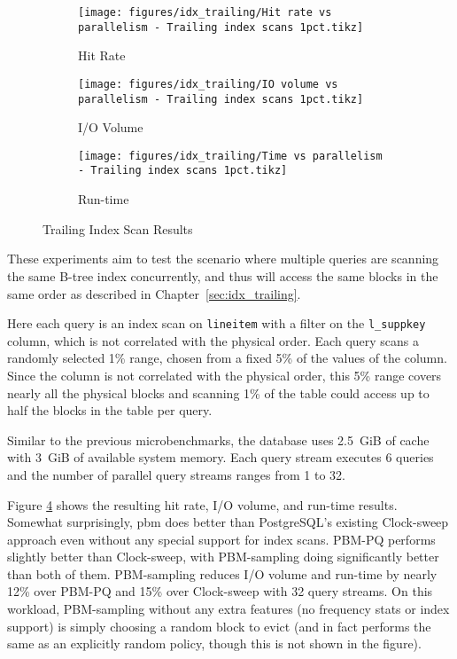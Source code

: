 \begin{figure}
\centering
    \begin{subfigure}{0.45\textwidth}
        \centering
        \texttt{[image: figures/idx\_trailing/Hit rate vs parallelism - Trailing index scans 1pct.tikz]}
        \caption{Hit Rate}
        \label{fig:idx_trailing_hitrate}
    \end{subfigure}\hspace{0.05\textwidth}%
    \begin{subfigure}{0.45\textwidth}
        \centering
        \texttt{[image: figures/idx\_trailing/IO volume vs parallelism - Trailing index scans 1pct.tikz]}
        \caption{I/O Volume}
        \label{fig:idx_trailing_iovol}
    \end{subfigure}
    
\vspace{20pt}
    \begin{subfigure}{0.45\textwidth}
        \centering
        \texttt{[image: figures/idx\_trailing/Time vs parallelism - Trailing index scans 1pct.tikz]}
        \caption{Run-time}
        \label{fig:idx_trailing_runtime}
    \end{subfigure}
    \caption{Trailing Index Scan Results}
    \label{fig:idx_trailing}
\end{figure}


These experiments aim to test the scenario where multiple queries are scanning the same B-tree index concurrently, and thus will access the same blocks in the same order as described in Chapter~\ref{sec:idx_trailing}.

Here each query is an index scan on \verb|lineitem| with a filter on the \verb|l_suppkey| column, which is not correlated with the physical order. Each query scans a randomly selected 1\% range, chosen from a fixed 5\% of the values of the column. Since the column is not correlated with the physical order, this 5\% range covers nearly all the physical blocks and scanning 1\% of the table could access up to half the blocks in the table per query.

Similar to the previous microbenchmarks, the database uses 2.5~GiB of cache with 3~GiB of available system memory. Each query stream executes 6 queries and the number of parallel query streams ranges from 1 to 32.


Figure \ref{fig:idx_trailing} shows the resulting hit rate, I/O volume, and run-time results. Somewhat surprisingly, \gls{pbm} does better than PostgreSQL's existing Clock-sweep approach even without any special support for index scans. PBM-PQ performs slightly better than Clock-sweep, with PBM-sampling doing significantly better than both of them. PBM-sampling reduces I/O volume and run-time by nearly 12\% over PBM-PQ and 15\% over Clock-sweep with 32 query streams. On this workload, PBM-sampling without any extra features (no frequency stats or index support) is simply choosing a random block to evict (and in fact performs the same as an explicitly random policy, though this is not shown in the figure). 

